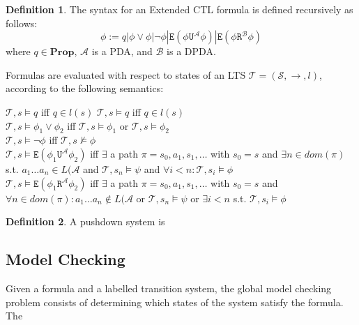 \documentclass[11pt]{article}
\theoremstyle{definition}
\newtheorem{mydef}{Definition}
\begin{document}
\begin{mydef}
The syntax for an Extended CTL formula is defined recursively as follows:
   \[ \phi := q | \phi \vee \phi | \neg \phi | \texttt{E}(\phi \texttt{U}^\mathcal{A} \phi) | \texttt{E}(\phi
   \texttt{R}^\mathcal{B} \phi) \]
where $q \in \textbf{Prop}$, $\mathcal{A}$ is a PDA, and $\mathcal{B}$ is a DPDA.

Formulas are evaluated with respect to states of an LTS $\mathcal{T} = (\mathcal{S},
\rightarrow, l)$, according to the following semantics:

$\mathcal{T}, s \models q$ iff $q \in l(s)$
$\mathcal{T}, s \models q$ iff $q \in l(s)$ \\
$\mathcal{T}, s \models \phi_1 \vee \phi_2$ iff $\mathcal{T}, s \models \phi_1$
or $\mathcal{T}, s \models \phi_2$ \\
$\mathcal{T}, s \models \neg \phi $ iff $\mathcal{T}, s \not\models \phi$ \\
$\mathcal{T}, s \models \texttt{E}(\phi_1 \texttt{U}^\mathcal{A} \phi_2) $ iff 
$\exists$ a path $\pi = s_0, a_1, s_1, \dots$ with $s_0 = s$ and $\exists n \in dom(\pi)$ s.t. $a_1 \dots a_n \in L(\mathcal{A}$ and $\mathcal{T}, s_n \models \psi$ and $\forall i < n : \mathcal{T}, s_i \models \phi$
\\ %
$\mathcal{T}, s \models \texttt{E}(\phi_1 \texttt{R}^\mathcal{A} \phi_2) $ iff 
$\exists$ a path $\pi = s_0, a_1, s_1, \dots$ with $s_0 = s$ and $\forall n \in dom(\pi): a_1 \dots a_n \not\in L(\mathcal{A}$ or $\mathcal{T}, s_n \models \psi$ or $\exists i < n$ s.t. $\mathcal{T}, s_i \models \phi$\\ %
\end{mydef}

\begin{mydef} A pushdown system is \end{mydef}



\subsection{Model Checking}

Given a formula and a labelled transition system, the global model checking
problem consists of determining which states of the system satisfy the formula.
The 
\end{document}
